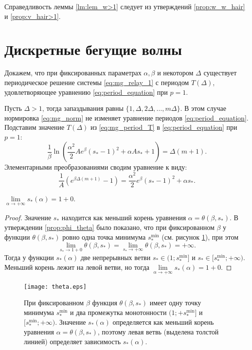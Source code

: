 Справедливость леммы \ref{lm:lem_w>1} следует из утверждений \ref{prop:w_w_hair} и \ref{prop:v_hair>1}.

\section{Дискретные бегущие волны}\label{sec:ch2/sect3}

Докажем, что при фиксированных параметрах $\alpha, \beta$ и некотором $\Delta$ существует периодическое решение системы \eqref{eq:mg_relay_1} с периодом $T(\Delta)$, удовлетворяющее уравнению \eqref{eq:period_equation} при $p = 1$.

Пусть $\Delta > 1$, тогда запаздывания равны $\{1, \Delta, 2\Delta, \ldots, m\Delta\}$. В этом случае нормировка \eqref{eq:mg_norm} не изменяет уравнение периодов \eqref{eq:period_equation}.  Подставим значение $T(\Delta)$ из \eqref{eq:mg_period_T} в \eqref{eq:period_equation} при $p = 1$:
%
\begin{equation}
	\label{eq:period_eq}
	\dfrac{1}{\beta}\ln\left( \frac{\alpha^2}{2}Ae^{\beta}( s_*-1)^2+\alpha A s_* + 1\right) = \Delta (m + 1).
\end{equation}
%
Элементарными преобразованиями сводим уравнение к виду:
\begin{equation}
	\label{eq:period_eq_exp}
	\dfrac{1}{A}\left(e^{\beta\Delta(m + 1)} - 1\right) = \dfrac{\alpha^2}{2}e^{\beta}( s_* - 1)^2 + \alpha s_*.
\end{equation}

\begin{proposition}
	$\lim\limits_{\alpha\to+\infty} s_*(\alpha) = 1 + 0$.
\end{proposition}
\begin{proof}
	Значение $s_*$ находится как меньший корень уравнения $\alpha = \theta(\beta, s_*)$. В утверждении \ref{prop:phi_theta} было показано, что при фиксированном $\beta$ у функции $\theta(\beta,  s_*)$ ровно одна точка минимума $ s_*^{\text{min}}$ (см. рисунок \ref{fig:theta_func_min}), при этом
	\begin{equation}
		\lim\limits_{s_* \to 1+0} \theta(\beta, s_*) = \lim\limits_{s_*\to +\infty} \theta(\beta,  s_*) = +\infty.
	\end{equation}
	Тогда у функции $s_*(\alpha)$ две непрерывных ветви $s_* \in (1;  s_*^{\text{min}}]$ и $ s_* \in [ s_*^{\text{min}}; +\infty)$. Меньший корень лежит на левой ветви, но тогда $\lim\limits_{\alpha\to+\infty} s_*(\alpha)= 1 + 0$.
\end{proof}
%
\begin{figure}
	\centering
	\texttt{[image: theta.eps]}
	\caption{При фиксированном $\beta$ функция $\theta(\beta,  s_*)$ имеет одну точку минимума $ s_*^{\min}$ и два промежутка монотонности $(1; + s_*^{\min}]$ и $[ s_*^{\min}; +\infty)$. Значение $ s_*(\alpha)$ определяется как меньший корень уравнения $\alpha = \theta(\beta,  s_*)$, поэтому левая ветвь (выделена толстой линией) определяет зависимость $ s_*(\alpha)$.}
	\label{fig:theta_func_min}
\end{figure}


